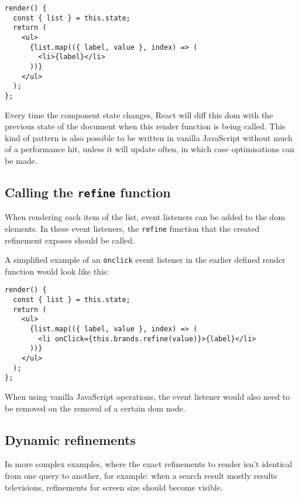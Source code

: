 \begin{minipage}{\linewidth}
\begin{lstlisting}[caption={Taking the data from the refinement and applying it to DOM},label={lst:core-react-dom}]
render() {
  const { list } = this.state;
  return (
    <ul>
      {list.map(({ label, value }, index) => (
        <li>{label}</li>
      ))}
    </ul>
  );
};
\end{lstlisting}
\end{minipage}

Every time the component state changes, React will diff this \acrshort{dom} with the previous state of the document when this render function is being called. This kind of pattern is also possible to be written in vanilla JavaScript without much of a performance hit, unless it will update often, in which case optimisations can be made.

\subsection{Calling the {\tt refine} function}
\label{subs:refining}

When rendering each item of the list, event listeners can be added to the \acrshort{dom} elements. In these event listeners, the {\tt refine} function that the created refinement exposes should be called.

A simplified example of an {\tt onclick} event listener in the earlier defined render function would look like this:

\begin{minipage}{\linewidth}
\begin{lstlisting}[caption={Refining on a user action},label={lst:core-react-refine}]
render() {
  const { list } = this.state;
  return (
    <ul>
      {list.map(({ label, value }, index) => (
        <li onClick={this.brands.refine(value)}>{label}</li>
      ))}
    </ul>
  );
};
\end{lstlisting}
\end{minipage}

When using vanilla JavaScript operations, the event listener would also need to be removed on the removal of a certain \acrshort{dom} node.

\subsection{Dynamic \glspl{refinement}}
\label{dynamic_refinements}

In more complex examples, where the exact refinements to render isn't identical from one query to another, for example: when a search result mostly results televisions, refinements for screen size should become visible. 

